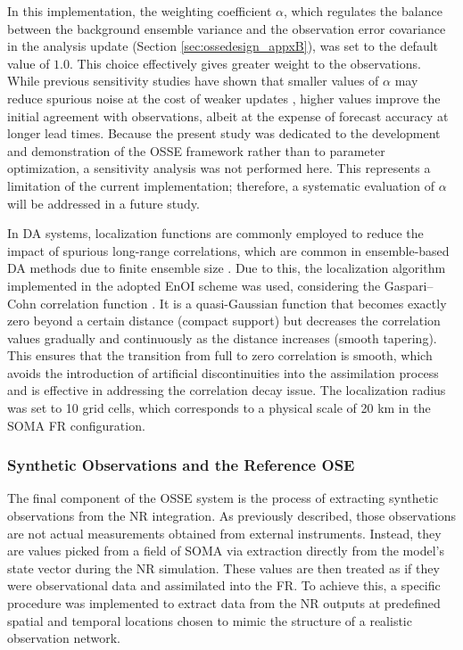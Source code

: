 In this implementation, the weighting coefficient $\alpha$, which regulates the balance between the background ensemble variance and the observation error covariance in the analysis update (Section \ref{sec:ossedesign_appxB}), was set to the default value of $1.0$. This choice effectively gives greater weight to the observations. While previous sensitivity studies have shown that smaller values of $\alpha$ may reduce spurious noise at the cost of weaker updates \parencite{counillon2009high}, higher values improve the initial agreement with observations, albeit at the expense of forecast accuracy at longer lead times. Because the present study was dedicated to the development and demonstration of the OSSE framework rather than to parameter optimization, a sensitivity analysis was not performed here. This represents a limitation of the current implementation; therefore, a systematic evaluation of $\alpha$ will be addressed in a future study.

In DA systems, localization functions are commonly employed to reduce the impact of spurious long-range correlations, which are common in ensemble-based DA methods due to finite ensemble size \parencite{carrassi2018data}. Due to this, the localization algorithm implemented in the adopted EnOI scheme was used, considering the Gaspari--Cohn correlation function \parencite{gaspari1999construction}. It is a quasi-Gaussian function that becomes exactly zero beyond a certain distance (compact support) but decreases the correlation values gradually and continuously as the distance increases (smooth tapering). This ensures that the transition from full to zero correlation is smooth, which avoids the introduction of artificial discontinuities into the assimilation process and is effective in addressing the correlation decay issue. The localization radius was set to 10 grid cells, which corresponds to a physical scale of 20 km in the SOMA FR configuration.

\subsubsection{Synthetic Observations and the Reference OSE}
\hypertarget{subsec:ossedesign_synthetic}{}

The final component of the OSSE system is the process of extracting synthetic observations from the NR integration. As previously described, those observations are not actual measurements obtained from external instruments. Instead, they are values picked from a field of SOMA via extraction directly from the model's state vector during the NR simulation. These values are then treated as if they were observational data and assimilated into the FR. To achieve this, a specific procedure was implemented to extract data from the NR outputs at predefined spatial and temporal locations chosen to mimic the structure of a realistic observation network.

